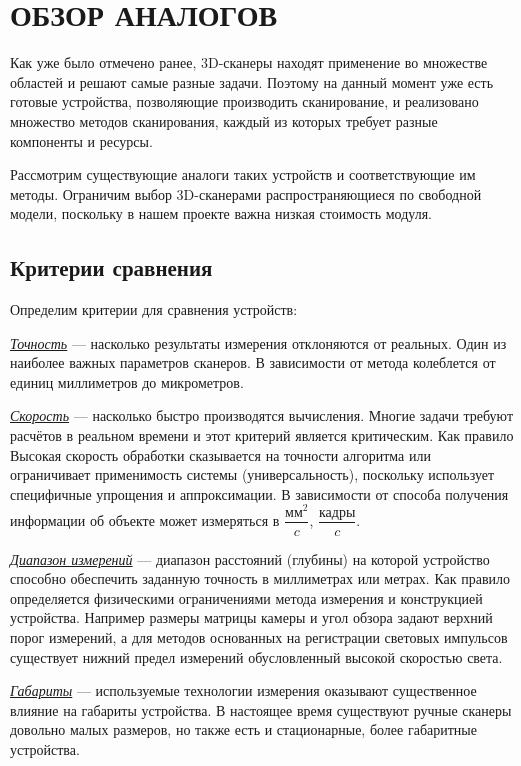\chapter{ОБЗОР АНАЛОГОВ}
    Как уже было отмечено ранее, 3D-сканеры находят применение во множестве областей и решают самые разные задачи. Поэтому на данный момент уже есть готовые устройства, позволяющие производить сканирование, и реализовано множество методов сканирования, каждый из которых требует разные компоненты и ресурсы. 
    
    Рассмотрим существующие аналоги таких устройств и соответствующие им методы. Ограничим выбор 3D-сканерами распространяющиеся по свободной модели, поскольку в нашем проекте важна низкая стоимость модуля.
    
    \section{Критерии сравнения}
        Определим критерии для сравнения устройств:
        
        \underline{\textit{Точность}} --- насколько результаты измерения отклоняются от реальных. Один из наиболее важных параметров сканеров. В зависимости от метода колеблется от единиц миллиметров до микрометров.
        
        \underline{\textit{Скорость}} --- насколько быстро производятся вычисления. Многие задачи требуют расчётов в реальном времени и этот критерий является критическим. Как правило Высокая скорость обработки сказывается на точности алгоритма или ограничивает применимость системы (универсальность), поскольку использует специфичные упрощения и аппроксимации. В зависимости от способа получения информации об объекте может измеряться в $ \dfrac{\text{мм}^2}{c} $, $ \dfrac{\text{кадры}}{c} $.
        
        \underline{\textit{Диапазон измерений}} --- диапазон расстояний (глубины) на которой  устройство способно обеспечить заданную точность в миллиметрах или метрах. Как правило определяется физическими ограничениями метода измерения и конструкцией устройства. Например размеры матрицы камеры и угол обзора задают верхний порог измерений, а для методов основанных на регистрации световых импульсов существует нижний предел измерений обусловленный высокой скоростью света.
        
        \underline{\textit{Габариты}} --- используемые технологии измерения оказывают существенное влияние на габариты устройства. В настоящее время существуют ручные сканеры довольно малых размеров, но также есть и стационарные, более габаритные устройства.

